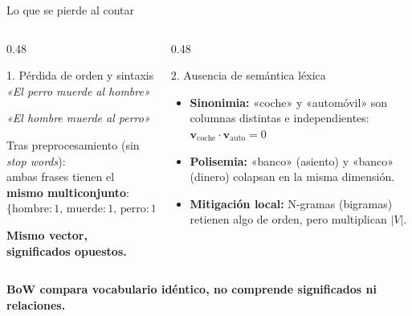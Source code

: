 \documentclass[aspectratio=169,10pt]{beamer}
\begin{document}
\begin{frame}[label={sec:orgad7deab}]{Lo que se pierde al contar}
\vspace{-0.5em}
\begin{columns}[T,onlytextwidth]
  \begin{column}{0.48\textwidth}
    \begin{block}{1. Pérdida de orden y sintaxis}
      \centering
      \smallskip
      \textit{«El \alert{perro} muerde al \alert{hombre}»}\par
      \textit{«El \alert{hombre} muerde al \alert{perro}»}\par
      \medskip
      \small
      Tras preprocesamiento (sin \textit{stop words}):\\
      ambas frases tienen el \textbf{mismo multiconjunto}:\\
      $\{\text{hombre}: 1,\, \text{muerde}: 1,\, \text{perro}: 1\}$\par
      \smallskip
      \textbf{\alert{Mismo vector, significados opuestos.}}
    \end{block}
  \end{column}

  \begin{column}{0.48\textwidth}
    \begin{block}{2. Ausencia de semántica léxica}
      \begin{itemize}\setlength{\itemsep}{0.3em}
        \item \textbf{Sinonimia:} «coche» y «automóvil» son columnas distintas e independientes:
        $\mathbf{v}_{\text{coche}} \cdot \mathbf{v}_{\text{auto}} = 0$
        \item \textbf{Polisemia:} «banco» (asiento) y «banco» (dinero) colapsan en la misma dimensión.
        \item \textbf{Mitigación local:} N-gramas (bigramas) retienen algo de orden, pero multiplican $|V|$.
      \end{itemize}
    \end{block}
  \end{column}
\end{columns}

\bigskip
\begin{center}
  \alert{\textbf{BoW compara vocabulario idéntico, no comprende significados ni relaciones.}}
\end{center}
\end{frame}
\end{document}

